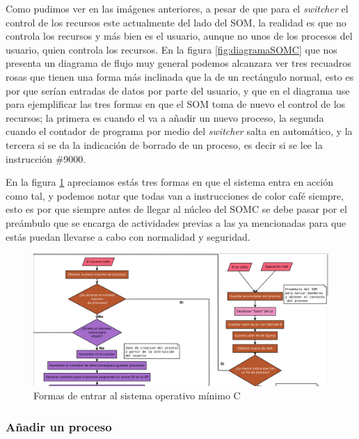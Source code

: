 \documentclass[letterpaper,12pt,oneside]{book}
\begin{document}
		Como pudimos ver en las imágenes anteriores, a pesar de que para el \textit{switcher} el control de los recursos este actualmente del lado
		del SOM, la realidad es que no controla los recursos y más bien es el usuario, aunque no unos de los procesos del usuario, quien controla
		los recursos. En la figura \ref{fig:diagramaSOMC} que nos presenta un diagrama de flujo muy general podemos alcanzara ver tres recuadros
		rosas que tienen una forma más inclinada que la de un rectángulo normal, esto es por que serían entradas de datos por parte del usuario, y
		que en el diagrama use para ejemplificar las tres formas en que el SOM toma de nuevo el control de los recursos; la primera es cuando
		el va a añadir un nuevo proceso, la segunda cuando el contador de programa por medio del \textit{switcher} salta en automático, y la tercera
		si se da la indicación de borrado de un proceso, es decir si se lee la instrucción \#9000.
		
		
		En la figura \ref{fig:eccSOMCdiagent} apreciamos estás tres formas en que el sistema entra en acción como tal, y podemos notar que todas van a instrucciones
		de color café siempre, esto es por que siempre antes de llegar al núcleo del SOMC se debe pasar por el preámbulo que se encarga de actividades previas
		a las ya mencionadas para que estás puedan llevarse a cabo con normalidad y seguridad.
		
		
		\begin{figure}[h]		
			\centering
			\includegraphics[scale=0.25]{media/CARDIACC/ecardiaccDiagrama_entradas.png}
			\caption{Formas de entrar al sistema operativo mínimo C}
			\label{fig:eccSOMCdiagent}
		\end{figure}
		
		
		\subsubsection{Añadir un proceso}
		
\end{document}

